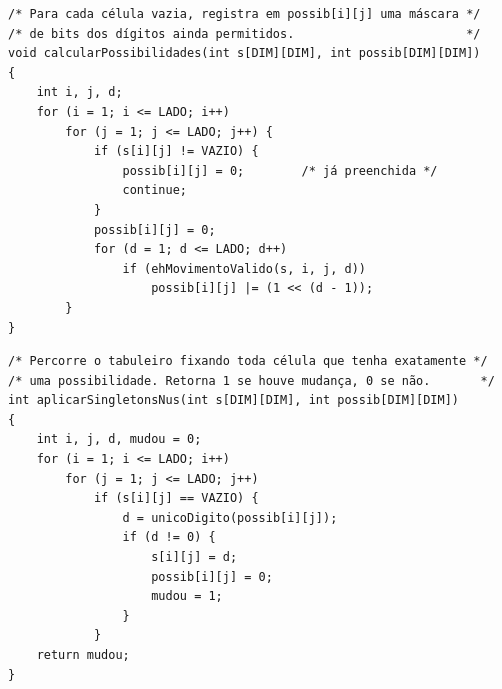 \documentclass[11pt,a4paper,oneside]{report}
\begin{document}
\begin{lstlisting}[caption={Cálculo da matriz de possibilidades para cada célula.},label={lst:poss}]
/* Para cada célula vazia, registra em possib[i][j] uma máscara */
/* de bits dos dígitos ainda permitidos.                        */
void calcularPossibilidades(int s[DIM][DIM], int possib[DIM][DIM])
{
    int i, j, d;
    for (i = 1; i <= LADO; i++)
        for (j = 1; j <= LADO; j++) {
            if (s[i][j] != VAZIO) {
                possib[i][j] = 0;        /* já preenchida */
                continue;
            }
            possib[i][j] = 0;
            for (d = 1; d <= LADO; d++)
                if (ehMovimentoValido(s, i, j, d))
                    possib[i][j] |= (1 << (d - 1));
        }
}
\end{lstlisting}

\begin{lstlisting}[caption={Aplicação dos singletons nus.},label={lst:singleton_nu}]
/* Percorre o tabuleiro fixando toda célula que tenha exatamente */
/* uma possibilidade. Retorna 1 se houve mudança, 0 se não.       */
int aplicarSingletonsNus(int s[DIM][DIM], int possib[DIM][DIM])
{
    int i, j, d, mudou = 0;
    for (i = 1; i <= LADO; i++)
        for (j = 1; j <= LADO; j++)
            if (s[i][j] == VAZIO) {
                d = unicoDigito(possib[i][j]);
                if (d != 0) {
                    s[i][j] = d;
                    possib[i][j] = 0;
                    mudou = 1;
                }
            }
    return mudou;
}
\end{lstlisting}
\end{document}
